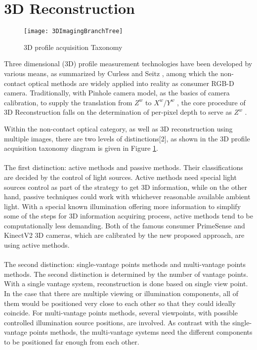 \section{3D Reconstruction}
%
\begin{figure}[h]
\centering
\texttt{[image: 3DImagingBranchTree]}
\caption{ 3D profile acquisition Taxonomy}
\label{3DImagingTaxonomy}
\end{figure}%
\par%
Three dimensional (3D) profile measurement technologies have been developed by various means, as summarized by Curless and Seitz \cite{Reference1}, %
among which the non-contact optical methods are widely applied into reality as consumer RGB-D camera. Traditionally, with Pinhole camera model, as the basics of camera calibration, to supply the translation from \(Z^{w}\)  to \(X^{w}\)/\(Y^{w}\) , the core procedure of 3D Reconstruction falls on the determination of per-pixel depth to serve as \(Z^{w}\) .\par%
%
Within the non-contact optical category, as well as 3D reconstruction using multiple images, there are two levels of distinctions[2],
 as shown in the 3D profile acquisition taxonomy diagram is given in Figure \ref{3DImagingTaxonomy}.
 \\\\The first distinction: active methods and passive methods. Their classifications are decided by the control of light sources. Active methods need special light sources control as part of the strategy to get 3D information, while on the other hand, passive techniques could work with whichever reasonable available ambient light. With a special known illumination offering more information to simplify some of the steps for 3D information acquiring process, active methods tend to be computationally less demanding. Both of the famous consumer PrimeSense and KinectV2 3D cameras, which are calibrated by the new proposed approach, are using active methods.
\\\\The second distinction: single-vantage points methods and multi-vantage points methods. The second distinction is determined by the number of vantage points. With a single vantage system, reconstruction is done based on single view point. In the case that there are multiple viewing or illumination components, all of them would be positioned very close to each other so that they could ideally coincide. For multi-vantage points methods, several viewpoints, with possible controlled illumination source positions, are involved. As contrast with the single-vantage points methods, the multi-vantage systems need the different components to be positioned far enough from each other. 
